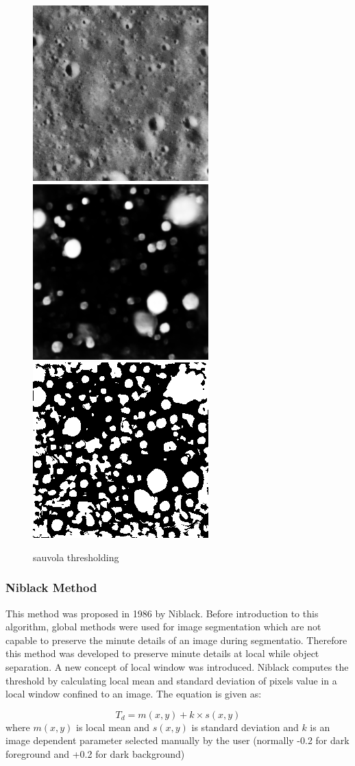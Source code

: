 \documentclass[11pt]{article}
\begin{document}
\begin{figure}[ht!]
	\includegraphics[width=.3\textwidth]{files/results/26.png}\hfill
	\includegraphics[width=.3\textwidth]{files/results/26_predict.png}\hfill
	\includegraphics[width=.3\textwidth]{files/results/sauvola.png}
	\caption{sauvola thresholding}
	\label{sauvola thresholding}
\end{figure}

\subsubsection{Niblack Method}
This method was proposed in 1986 by Niblack. Before introduction to this algorithm, global methods were used for image segmentation which are not capable to preserve the minute details of an image during segmentatio. Therefore this method was developed to preserve minute details at local while object separation. A new concept of local window was introduced. Niblack computes the threshold by calculating local mean and standard deviation of pixels value in a local window confined to an image. The equation is given as:

\begin{equation}
T_{d}=m(x, y)+k \times s(x, y)
\end{equation}
where $m(x, y)$ is local mean and $s(x, y)$ is standard deviation and $k$ is an image dependent parameter selected manually by the user (normally -0.2 for dark foreground and +0.2 for dark background)
\end{document}

